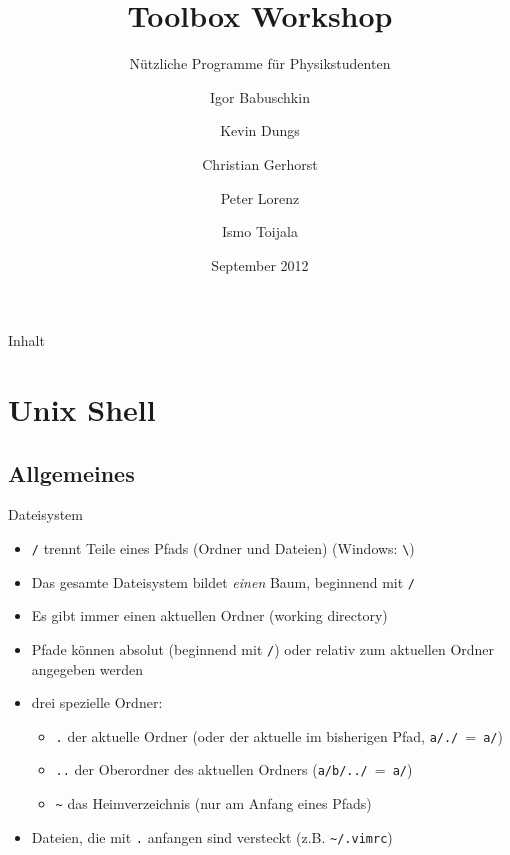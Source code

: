 \documentclass[t]{beamer}
\title{Toolbox Workshop}
\subtitle{Nützliche Programme für Physikstudenten}
\author[Igor B.\and Kevin D.\and Christian G.\and Peter L.\and Ismo T.]{
       Igor Babuschkin%
  \and Kevin Dungs%
  \and Christian Gerhorst%
  \and Peter Lorenz%
  \and Ismo Toijala%
}
\institute[PeP et al. e.V.]{PeP et al. e.V.\thanks{\href{http://pep-dortmund.org}{pep-dortmund.org}}}
\date{September 2012}
\begin{document}
  {
    \begin{frame}
      \titlepage
    \end{frame}
  }

  \begin{frame}{Inhalt}
    \tableofcontents
  \end{frame}

  \section{Unix Shell}
    \subsection{Allgemeines}
      \begin{frame}{Dateisystem}
        \begin{itemize}
          \item \texttt{/} trennt Teile eines Pfads (Ordner und Dateien) (Windows: \texttt{\textbackslash})
          \item Das gesamte Dateisystem bildet \emph{einen} Baum, beginnend mit \texttt{/}
          \item Es gibt immer einen aktuellen Ordner (working directory)
          \item Pfade können absolut (beginnend mit \texttt{/}) oder relativ zum aktuellen Ordner angegeben werden
          \item drei spezielle Ordner:
            \begin{itemize}
              \item \texttt{.} der aktuelle Ordner (oder der aktuelle im bisherigen Pfad, \texttt{a/./}~=~\texttt{a/})
              \item \texttt{..} der Oberordner des aktuellen Ordners (\texttt{a/b/../}~=~\texttt{a/})
              \item \texttt{\textasciitilde} das Heimverzeichnis (nur am Anfang eines Pfads)
            \end{itemize}
          \item Dateien, die mit \texttt{.} anfangen sind versteckt (z.B. \texttt{\textasciitilde/.vimrc})
        \end{itemize}
      \end{frame}
\end{document}
